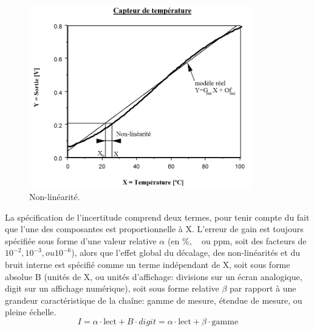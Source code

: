 \begin{center}
\end{center}

\begin{figure}
\centering
\includegraphics[height=8cm]{assets/figures/3_1_Non_Linearite.PNG}
\caption{Non-linéarité.}
\label{fig:Non-linéarité}
\end{figure}
La spécification de l'incertitude comprend deux termes, pour tenir compte du fait que l'une des composantes est proportionnelle à X. L'erreur de gain est toujours spécifiée sous forme d'une valeur relative $\alpha$ (en \%, \textperthousand ~ ou ppm, soit des facteurs de $10^{-2}, 10^{-3}, ou 10^{-6}$), alors que l'effet global du décalage, des non-linéarités et du bruit interne est spécifié comme un terme indépendant de X, soit sous forme absolue B (unités de X, ou unités d'affichage: divisions sur un écran analogique, digit sur un affichage numérique), soit sous forme relative $\beta$ par rapport à une grandeur caractéristique de la chaîne: gamme de mesure, étendue de mesure, ou pleine échelle.
\begin{equation}
I = \alpha \cdot \text{lect} + B \cdot digit = \alpha \cdot \text{lect} + \beta \cdot \text{gamme}
\end{equation}

